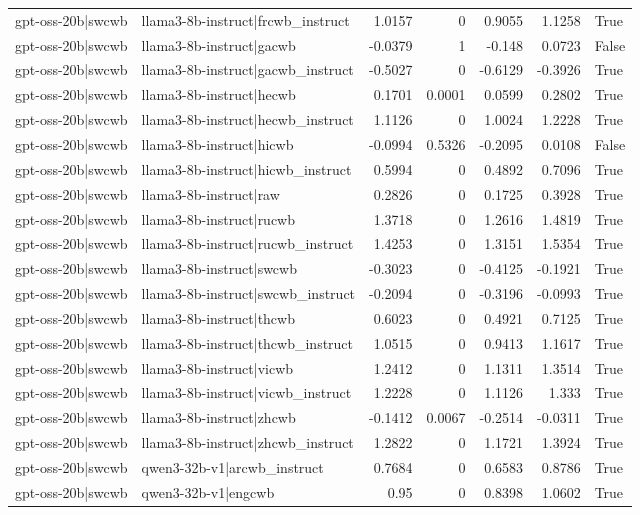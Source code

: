 \begin{table}
\begin{tabular}{l l r r r r l}
gpt-oss-20b|swcwb & llama3-8b-instruct|frcwb_instruct & 1.0157 & 0 & 0.9055 & 1.1258 & True \\
gpt-oss-20b|swcwb & llama3-8b-instruct|gacwb & -0.0379 & 1 & -0.148 & 0.0723 & False \\
gpt-oss-20b|swcwb & llama3-8b-instruct|gacwb_instruct & -0.5027 & 0 & -0.6129 & -0.3926 & True \\
gpt-oss-20b|swcwb & llama3-8b-instruct|hecwb & 0.1701 & 0.0001 & 0.0599 & 0.2802 & True \\
gpt-oss-20b|swcwb & llama3-8b-instruct|hecwb_instruct & 1.1126 & 0 & 1.0024 & 1.2228 & True \\
gpt-oss-20b|swcwb & llama3-8b-instruct|hicwb & -0.0994 & 0.5326 & -0.2095 & 0.0108 & False \\
gpt-oss-20b|swcwb & llama3-8b-instruct|hicwb_instruct & 0.5994 & 0 & 0.4892 & 0.7096 & True \\
gpt-oss-20b|swcwb & llama3-8b-instruct|raw & 0.2826 & 0 & 0.1725 & 0.3928 & True \\
gpt-oss-20b|swcwb & llama3-8b-instruct|rucwb & 1.3718 & 0 & 1.2616 & 1.4819 & True \\
gpt-oss-20b|swcwb & llama3-8b-instruct|rucwb_instruct & 1.4253 & 0 & 1.3151 & 1.5354 & True \\
gpt-oss-20b|swcwb & llama3-8b-instruct|swcwb & -0.3023 & 0 & -0.4125 & -0.1921 & True \\
gpt-oss-20b|swcwb & llama3-8b-instruct|swcwb_instruct & -0.2094 & 0 & -0.3196 & -0.0993 & True \\
gpt-oss-20b|swcwb & llama3-8b-instruct|thcwb & 0.6023 & 0 & 0.4921 & 0.7125 & True \\
gpt-oss-20b|swcwb & llama3-8b-instruct|thcwb_instruct & 1.0515 & 0 & 0.9413 & 1.1617 & True \\
gpt-oss-20b|swcwb & llama3-8b-instruct|vicwb & 1.2412 & 0 & 1.1311 & 1.3514 & True \\
gpt-oss-20b|swcwb & llama3-8b-instruct|vicwb_instruct & 1.2228 & 0 & 1.1126 & 1.333 & True \\
gpt-oss-20b|swcwb & llama3-8b-instruct|zhcwb & -0.1412 & 0.0067 & -0.2514 & -0.0311 & True \\
gpt-oss-20b|swcwb & llama3-8b-instruct|zhcwb_instruct & 1.2822 & 0 & 1.1721 & 1.3924 & True \\
gpt-oss-20b|swcwb & qwen3-32b-v1|arcwb_instruct & 0.7684 & 0 & 0.6583 & 0.8786 & True \\
gpt-oss-20b|swcwb & qwen3-32b-v1|engcwb & 0.95 & 0 & 0.8398 & 1.0602 & True \\

\end{tabular}
\end{table}
